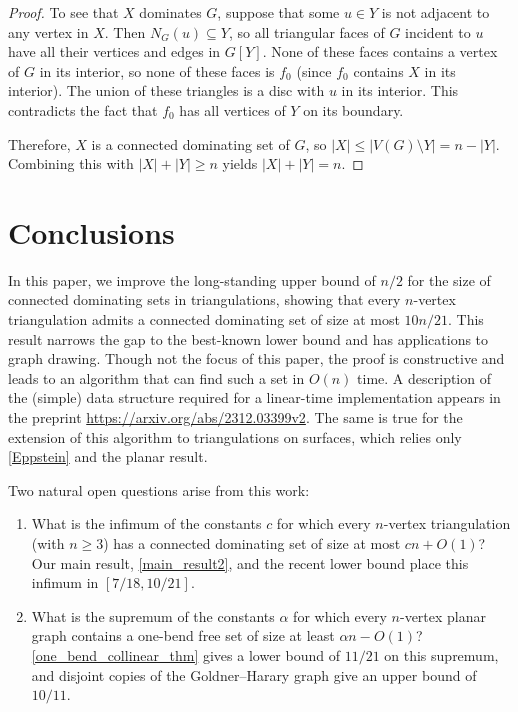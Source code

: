 \documentclass{patmorin}
\begin{document}
\begin{proof}
  To see that $X$ dominates $G$, suppose that some $u\in Y$ is not adjacent to any vertex in $X$. Then $N_G(u)\subseteq Y$, so all triangular faces of $G$ incident to $u$ have all their vertices and edges in $G[Y]$. None of these faces contains a vertex of $G$ in its interior, so none of these faces is $f_0$ (since $f_0$ contains $X$ in its interior). The union of these triangles is a disc with $u$ in its interior. This contradicts the fact that $f_0$ has all vertices of $Y$ on its boundary.

  Therefore, $X$ is a connected dominating set of $G$, so $|X| \le |V(G) \setminus Y| = n - |Y|$. Combining this with $|X| + |Y| \ge n$ yields $|X| + |Y| = n$.
\end{proof}

\section{Conclusions}
\label{conclusions}
In this paper, we improve the long-standing upper bound of $n/2$ for the size of connected dominating sets in triangulations, showing that every $n$-vertex triangulation admits a connected dominating set of size at most $10n/21$. This result narrows the gap to the best-known lower bound and has applications to graph drawing.  Though not the focus of this paper, the proof is constructive and leads to an algorithm that can find such a set in $O(n)$ time. A description of the (simple) data structure required for a linear-time implementation appears in the preprint \href{https://arxiv.org/abs/2312.03399v2}{https://arxiv.org/abs/2312.03399v2}.  The same is true for the extension of this algorithm to triangulations on surfaces, which relies only \cref{Eppstein} and the planar result. 




Two natural open questions arise from this work:

\begin{enumerate}
  \item What is the infimum of the constants $c$ for which every $n$-vertex triangulation (with $n\ge 3$) has a connected dominating set of size at most $c n+O(1)$? Our main result, \cref{main_result2}, and the recent lower bound \cite{enami2025contributionsconjecturesplanargraphs} place this infimum in $[7/18,10/21]$.

  \item What is the supremum of the constants $\alpha$ for which every $n$-vertex planar graph contains a one-bend free set of size at least $\alpha n-O(1)$?  \cref{one_bend_collinear_thm} gives a lower bound of $11/21$ on this supremum, and disjoint copies of the Goldner–Harary graph give an upper bound of $10/11$.

\end{enumerate}
\end{document}
